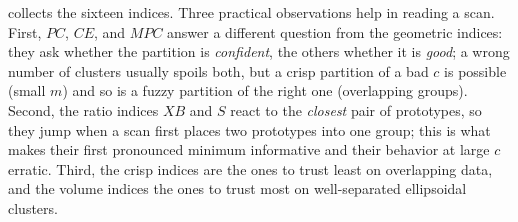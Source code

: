  collects the sixteen indices. Three practical observations help in reading a scan. First, $PC$, $CE$, and $MPC$ answer a different question from the geometric indices: they ask whether the partition is \emph{confident}, the others whether it is \emph{good}; a wrong number of clusters usually spoils both, but a crisp partition of a bad $c$ is possible (small $m$) and so is a fuzzy partition of the right one (overlapping groups). Second, the ratio indices $XB$ and $S$ react to the \emph{closest} pair of prototypes, so they jump when a scan first places two prototypes into one group; this is what makes their first pronounced minimum informative and their behavior at large $c$ erratic. Third, the crisp indices are the ones to trust least on overlapping data, and the volume indices the ones to trust most on well-separated ellipsoidal clusters.

